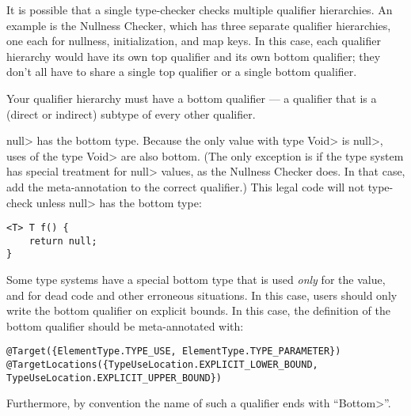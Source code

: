 It is possible that a single type-checker checks multiple qualifier hierarchies.
An example is the Nullness Checker, which has three separate qualifier
hierarchies, one each for
nullness, initialization, and map keys.  In this case, each qualifier hierarchy
would have its own top qualifier and its own bottom qualifier; they don't
all have to share a single top qualifier or a single bottom qualifier.


Your qualifier hierarchy must have a bottom qualifier
--- a qualifier that is a (direct or indirect) subtype of every other
qualifier.

\<null> has the bottom type. Because the only value with type \<Void> is
\<null>, uses of the type \<Void> are also bottom.
(The only exception
is if the type system has special treatment for \<null> values, as the
Nullness Checker does. In that case, add the meta-annotation
to the correct qualifier.)
This legal code
will not type-check unless \<null> has the bottom type:
\begin{Verbatim}
<T> T f() {
    return null;
}
\end{Verbatim}


Some type systems have a special bottom type that is used \emph{only} for
the  value, and for dead code and other erroneous situations.
In this case, users should only write the bottom qualifier on explicit
bounds.  In this case, the definition of the bottom qualifier should be
meta-annotated with:

%
\begin{Verbatim}
@Target({ElementType.TYPE_USE, ElementType.TYPE_PARAMETER})
@TargetLocations({TypeUseLocation.EXPLICIT_LOWER_BOUND, TypeUseLocation.EXPLICIT_UPPER_BOUND})
\end{Verbatim}

Furthermore, by convention the name of such a qualifier ends with ``\<Bottom>''.


